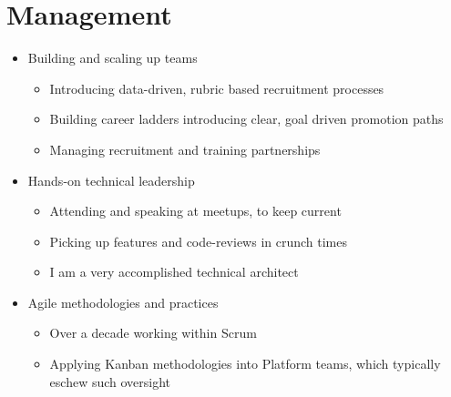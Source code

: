 \documentclass[11pt,a4paper,sans]{article}
\begin{document}
\section{Management}

\begin{itemize}
\item Building and scaling up teams
  \begin{itemize}
  \item Introducing data-driven, rubric based recruitment processes
  \item Building career ladders introducing clear, goal driven promotion paths
  \item Managing recruitment and training partnerships
  \end{itemize}
\item Hands-on technical leadership
  \begin{itemize}
  \item Attending and speaking at meetups, to keep current
  \item Picking up features and code-reviews in crunch times
  \item I am a very accomplished technical architect
  \end{itemize}
\item Agile methodologies and practices
  \begin{itemize}
  \item Over a decade working within Scrum
  \item Applying Kanban methodologies into Platform teams, which typically eschew such oversight
  \end{itemize}
\end{itemize}






\end{document}
